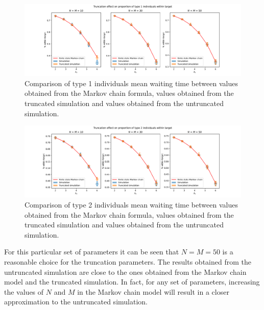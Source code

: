 \begin{figure}[H]
    \includegraphics[width=\textwidth]{chapters/03_queueing_model/img/numeric_results_and_timings/truncation_effect/proportion_type_1.pdf}
    \caption{
        Comparison of type 1 individuals mean waiting time between values
        obtained from the Markov chain formula, values obtained from the
        truncated simulation and values obtained from the untruncated
        simulation.
    }
    \label{fig:markov_vs_des_proportion_within_time_comparison_type_1}
\end{figure}

\begin{figure}[H]
    \includegraphics[width=\textwidth]{chapters/03_queueing_model/img/numeric_results_and_timings/truncation_effect/proportion_type_2.pdf}
    \caption{
        Comparison of type 2 individuals mean waiting time between values
        obtained from the Markov chain formula, values obtained from the
        truncated simulation and values obtained from the untruncated
        simulation.
    }
    \label{fig:markov_vs_des_proportion_within_time_comparison_type_2}
\end{figure}

For this particular set of parameters it can be seen that \(N=M=50\) is a
reasonable choice for the truncation parameters.
The results obtained from the untruncated simulation are close to the ones
obtained from the Markov chain model and the truncated simulation.
In fact, for any set of parameters, increasing the values of \(N\) and \(M\) in
the Markov chain model will result in a closer approximation to the untruncated
simulation.

